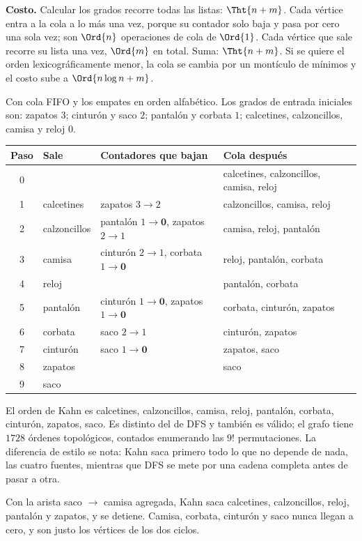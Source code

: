 \documentclass[11pt,letterpaper]{article}
\begin{document}
\textbf{Costo.} Calcular los grados recorre todas las listas:
$\Tht{n + m}$. Cada vértice entra a la cola a lo más una vez, porque su
contador solo baja y pasa por cero una sola vez; son $\Ord{n}$
operaciones de cola de $\Ord{1}$. Cada vértice que sale recorre su
lista una vez, $\Ord{m}$ en total. Suma: $\Tht{n + m}$. Si se quiere el
orden lexicográficamente menor, la cola se cambia por un montículo de
mínimos y el costo sube a $\Ord{n \log n + m}$.

\begin{ejemplo}
  \label{ej:ropa-kahn}
  Con cola FIFO y los empates en orden alfabético. Los grados de
  entrada iniciales son: zapatos $3$; cinturón y saco $2$; pantalón y
  corbata $1$; calcetines, calzoncillos, camisa y reloj $0$.
  \begin{center}
  \small
  \begin{tabular}{clll}
    \toprule
    \textbf{Paso} & \textbf{Sale} & \textbf{Contadores que bajan}
      & \textbf{Cola después} \\
    \midrule
    0 & & & calcetines, calzoncillos, camisa, reloj \\
    1 & calcetines & zapatos $3 \to 2$ & calzoncillos, camisa,
      reloj \\
    2 & calzoncillos & pantalón $1 \to \mathbf{0}$, zapatos
      $2 \to 1$ & camisa, reloj, pantalón \\
    3 & camisa & cinturón $2 \to 1$, corbata $1 \to \mathbf{0}$
      & reloj, pantalón, corbata \\
    4 & reloj & & pantalón, corbata \\
    5 & pantalón & cinturón $1 \to \mathbf{0}$, zapatos
      $1 \to \mathbf{0}$ & corbata, cinturón, zapatos \\
    6 & corbata & saco $2 \to 1$ & cinturón, zapatos \\
    7 & cinturón & saco $1 \to \mathbf{0}$ & zapatos, saco \\
    8 & zapatos & & saco \\
    9 & saco & & \\
    \bottomrule
  \end{tabular}
  \end{center}
  El orden de Kahn es calcetines, calzoncillos, camisa, reloj,
  pantalón, corbata, cinturón, zapatos, saco. Es distinto del de DFS y
  también es válido; el grafo tiene $1728$ órdenes topológicos,
  contados enumerando las $9!$ permutaciones. La diferencia de estilo
  se nota: Kahn saca primero todo lo que no depende de nada, las cuatro
  fuentes, mientras que DFS se mete por una cadena completa antes de
  pasar a otra.

  Con la arista saco $\to$ camisa agregada, Kahn saca calcetines,
  calzoncillos, reloj, pantalón y zapatos, y se detiene. Camisa,
  corbata, cinturón y saco nunca llegan a cero, y son justo los
  vértices de los dos ciclos.
\end{ejemplo}
\end{document}
